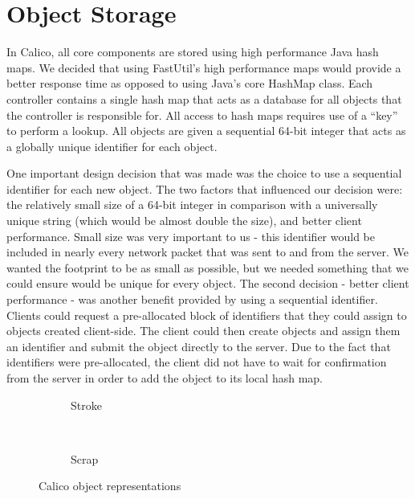 \section{Object Storage}
In Calico, all core components are stored using high performance Java hash maps. 
We decided that using FastUtil's\cite{fastutil} high performance maps would provide a better response time as opposed to using Java's core HashMap class. 
Each controller contains a single hash map that acts as a database for all objects that the controller is responsible for.
All access to hash maps requires use of a ``key'' to perform a lookup.
All objects are given a sequential 64-bit integer that acts as a globally unique identifier for each object.

One important design decision that was made was the choice to use a sequential identifier for each new object. The two factors that influenced our decision were: the relatively small size of a 64-bit integer in comparison with a universally unique string (which would be almost double the size), and better client performance.
Small size was very important to us - this identifier would be included in nearly every network packet that was sent to and from the server. We wanted the footprint to be as small as possible, but we needed something that we could ensure would be unique for every object. 
The second decision - better client performance - was another benefit provided by using a sequential identifier. Clients could request a pre-allocated block of identifiers that they could assign to objects created client-side. The client could then create objects and assign them an identifier and submit the object directly to the server. Due to the fact that identifiers were pre-allocated, the client did not have to wait for confirmation from the server in order to add the object to its local hash map.


\begin{figure}[h!]
  \centering
  \begin{subfigure}[t]{0.4\textwidth}
    \centering
    \small
    
    \normalsize
    \caption{Stroke}
    \label{code:stroke_storage}
  \end{subfigure}%
  ~ %
  \begin{subfigure}[t]{0.4\textwidth}
    \centering
    \small
    
    \normalsize
    \caption{Scrap}
    \label{code:scrap_storage}
  \end{subfigure}
  \caption{Calico object representations}
  \label{code:storage}
\end{figure}

